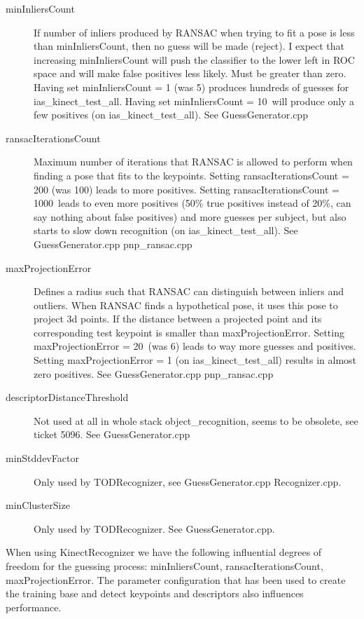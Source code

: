 \begin{description}
    \item[minInliersCount] If number of inliers produced by RANSAC when trying
    to fit a pose is less than minInliersCount, then no guess will be made
    (reject). I expect that increasing minInliersCount will push the classifier to
    the lower left in ROC space and will make false positives less likely.  Must be
    greater than zero. Having set minInliersCount = 1 (was 5) produces hundreds of
    guesses for ias\_kinect\_test\_all. Having set minInliersCount = 10 will
    produce only a few positives (on ias\_kinect\_test\_all). See GuessGenerator.cpp
    \item[ransacIterationsCount] Maximum number of iterations that RANSAC is
    allowed to perform when finding a pose that fits to the keypoints.  Setting
    ransacIterationsCount = 200 (was 100) leads to more positives. Setting
    ransacIterationsCount = 1000 leads to even more positives (50\% true positives
    instead of 20\%, can say nothing about false positives) and more guesses per
    subject, but also starts to slow down recognition (on ias\_kinect\_test\_all).
    See GuessGenerator.cpp pnp\_ransac.cpp
    \item[maxProjectionError] Defines a radius such that RANSAC can distinguish
    between inliers and outliers. When RANSAC finds a hypothetical pose, it uses
    this pose to project 3d points. If the distance between a projected point and
    its corresponding test keypoint is smaller than maxProjectionError.
    Setting maxProjectionError = 20 (was 6) leads to way more guesses and
    positives. Setting maxProjectionError = 1 (on ias\_kinect\_test\_all) results in
    almost zero positives.  See GuessGenerator.cpp pnp\_ransac.cpp
    \item[descriptorDistanceThreshold] Not used at all in whole stack
    object\_recognition, seems to be obsolete, see ticket 5096. See GuessGenerator.cpp
    \item[minStddevFactor] Only used by TODRecognizer, see GuessGenerator.cpp
    Recognizer.cpp.
    \item[minClusterSize] Only used by TODRecognizer. See GuessGenerator.cpp.
\end{description}

When using KinectRecognizer we have the following influential degrees of
freedom for the guessing process: minInliersCount, ransacIterationsCount,
maxProjectionError. The parameter configuration that has been used to create
the training base and detect keypoints and descriptors also influences
performance.




